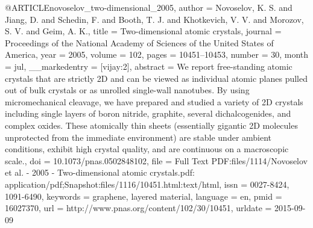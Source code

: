 @ARTICLE{novoselov_two-dimensional_2005,
  author = {Novoselov, K. S. and Jiang, D. and Schedin, F. and Booth, T. J. and
	Khotkevich, V. V. and Morozov, S. V. and Geim, A. K.},
  title = {Two-dimensional atomic crystals},
  journal = {Proceedings of the National Academy of Sciences of the United States
	of America},
  year = {2005},
  volume = {102},
  pages = {10451--10453},
  number = {30},
  month = jul,
  __markedentry = {[vijay:2]},
  abstract = {We report free-standing atomic crystals that are strictly 2D and can
	be viewed as individual atomic planes pulled out of bulk crystals
	or as unrolled single-wall nanotubes. By using micromechanical cleavage,
	we have prepared and studied a variety of 2D crystals including single
	layers of boron nitride, graphite, several dichalcogenides, and complex
	oxides. These atomically thin sheets (essentially gigantic 2D molecules
	unprotected from the immediate environment) are stable under ambient
	conditions, exhibit high crystal quality, and are continuous on a
	macroscopic scale.},
  doi = {10.1073/pnas.0502848102},
  file = {Full Text PDF:files/1114/Novoselov et al. - 2005 - Two-dimensional atomic crystals.pdf:          application/pdf;Snapshot:files/1116/10451.html:text/html},
  issn = {0027-8424, 1091-6490},
  keywords = {graphene, layered material},
  language = {en},
  pmid = {16027370},
  url = {http://www.pnas.org/content/102/30/10451},
  urldate = {2015-09-09}
}

